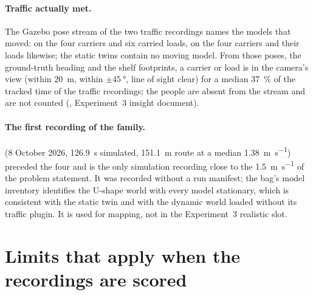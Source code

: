 \documentclass[11pt,a4paper,notitlepage]{report}
\begin{document}
\paragraph{Traffic actually met.} The Gazebo pose stream of the two traffic
recordings names the models that moved: on  the four
carriers and six carried loads, on  the four carriers and
their loads likewise; the static twins contain no moving model. From those
poses, the ground-truth heading and the shelf footprints, a carrier or load is
in the camera's view (within \SI{20}{\metre}, within $\pm\SI{45}{\degree}$,
line of sight clear) for a median \SI{37}{\percent} of the tracked time of the
traffic recordings; the people are absent from the stream and are not counted
(, Experiment~3 insight document).

\paragraph{The first recording of the family.} 
(8 October 2026, \SI{126.9}{\second} simulated, \SI{151.1}{\metre} route at a
median \SI{1.38}{\metre\per\second}) preceded the four and is the only
simulation recording close to the \SI{1.5}{\metre\per\second} of the problem
statement. It was recorded without a run manifest; the bag's model inventory
identifies the U-shape world with every model stationary, which is consistent
with the static twin and with the dynamic world loaded without its traffic
plugin. It is used for mapping, not in the Experiment~3 realistic slot.

\section{Limits that apply when the recordings are scored}
\end{document}

